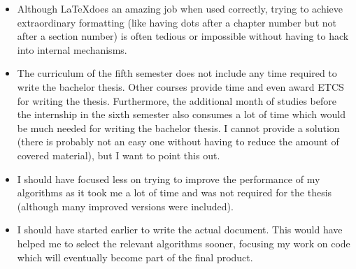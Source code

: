 \begin{itemize}
	\item[\negative] Although \LaTeX does an amazing job when used correctly, trying to achieve extraordinary formatting (like having dots after a chapter number but not after a section number) is often tedious or impossible without having to hack into internal mechanisms.
	
	\item[\negative] The curriculum of the fifth semester does not include any time required to write the bachelor thesis. Other courses provide time and even award ETCS for writing the thesis. Furthermore, the additional month of studies before the internship in the sixth semester also consumes a lot of time which would be much needed for writing the bachelor thesis. I cannot provide a solution (there is probably not an easy one without having to reduce the amount of covered material), but I want to point this out.
	
	\item[\negative] I should have focused less on trying to improve the performance of my algorithms as it took me a lot of time and was not required for the thesis (although many improved versions were included).
	
	\item[\negative] I should have started earlier to write the actual document. This would have helped me to select the relevant algorithms sooner, focusing my work on code which will eventually become part of the final product.
	
\end{itemize}













